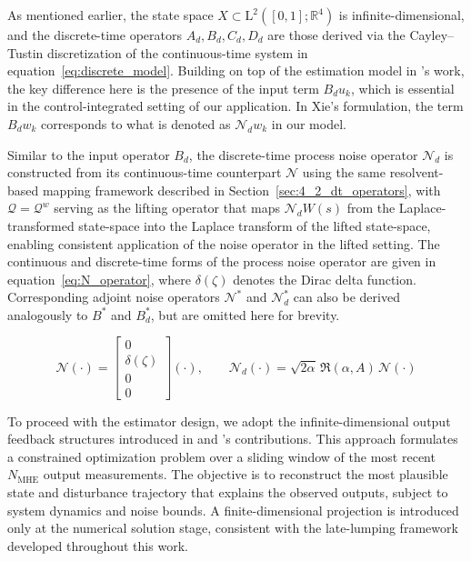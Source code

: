 As mentioned earlier, the state space $X \subset \mathrm{L}^2([0,1]; \mathbb{R}^4)$ is infinite-dimensional, and the discrete-time operators $A_d, B_d, C_d, D_d$ are those derived via the Cayley--Tustin discretization of the continuous-time system in equation~\eqref{eq:discrete_model}. Building on top of the estimation model in 's work\autocite{xie2022constrained}, the key difference here is the presence of the input term $B_d u_k$, which is essential in the control-integrated setting of our application. In Xie's formulation, the term $B_d w_k$ corresponds to what is denoted as $\mathcal{N}_d w_k$ in our model.

Similar to the input operator $B_d$, the discrete-time process noise operator $\mathcal{N}_d$ is constructed from its continuous-time counterpart $\mathcal{N}$ using the same resolvent-based mapping framework described in Section~\ref{sec:4_2_dt_operators}, with $\mathcal{Q} = \mathcal{Q}^w$ serving as the lifting operator that maps $\mathcal{N}_d W(s)$ from the Laplace-transformed state-space into the Laplace transform of the lifted state-space, enabling consistent application of the noise operator in the lifted setting. The continuous and discrete-time forms of the process noise operator are given in equation~\eqref{eq:N_operator}, where $\delta(\zeta)$ denotes the Dirac delta function. Corresponding adjoint noise operators $\mathcal{N}^\ast$ and $\mathcal{N}_d^\ast$ can also be derived analogously to $B^\ast$ and $B_d^\ast$, but are omitted here for brevity.

\begin{equation} \label{eq:N_operator}
    \mathcal{N} (\cdot) = \begin{bmatrix} 0 \\ \delta(\zeta) \\ 0 \\ 0 \end{bmatrix} (\cdot), \qquad \mathcal{N}_d (\cdot) = \sqrt{2\alpha} \, \mathfrak{R}(\alpha, A) \, \mathcal{N} (\cdot)
\end{equation}

To proceed with the estimator design, we adopt the infinite-dimensional output feedback structures introduced in  and 's contributions\autocite{xie2022constrained, zhang2023tracking}. This approach formulates a constrained optimization problem over a sliding window of the most recent $N_{\mathrm{MHE}}$ output measurements. The objective is to reconstruct the most plausible state and disturbance trajectory that explains the observed outputs, subject to system dynamics and noise bounds. A finite-dimensional projection is introduced only at the numerical solution stage, consistent with the late-lumping framework developed throughout this work.

